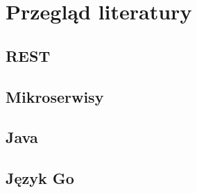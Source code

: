 \chapter{Przegląd literatury}

\section{REST}


\section{Mikroserwisy}


\section{Java}


\section{Język Go}

